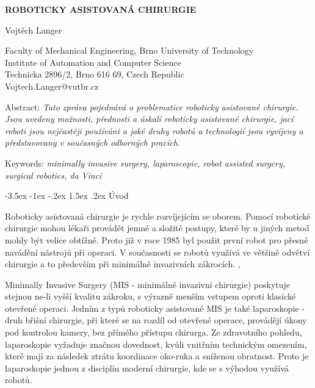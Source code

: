 \documentclass[10pt, a4paper]{article}
\makeatletter
\theoremstyle{definition}
\renewcommand\section{\@startsection {section}{1}{\z@}%
                                   {-3.5ex \@plus -1ex \@minus -.2ex}%
                                   {1.5ex \@plus.2ex}%
                                   {\large\bfseries}}
\makeatother
\begin{document}
\pagestyle{empty}

\begin{center}
{\bf \Large ROBOTICKY ASISTOVANÁ CHIRURGIE}
\end{center}

\smallskip
\begin{center}
{\large Vojtěch Langer}
\end{center}

\smallskip
\begin{center}
Faculty of Mechanical Engineering, Brno University of Technology\\
Institute of Automation and Computer Science\\
Technicka 2896/2, Brno 616 69, Czech Republic\\
Vojtech.Langer@vutbr.cz\\
\end{center}

\bigskip
\noindent Abstract:
\textit{Tato zpráva pojednává o problematice roboticky asistované chirurgie.
Jsou uvedeny možnosti, přednosti a úskalí roboticky asistované chirurgie,
jací roboti jsou nejčastěji používáni a jaké druhy robotů a technologií
jsou vyvíjeny a představovany v současných odborných pracích.}

\vspace*{10pt}
\noindent Keywords:
\textit{minimally invasive surgery,
laparoscopic, robot assisted surgery,
surgical robotics, da Vinci}
\bigskip

\section{Úvod}
\label{sec:uvod}

Roboticky asistovaná chirurgie je rychle rozvíjejícím se oborem.
Pomocí robotické chirurgie mohou lékaři provádět jemné a složité postupy,
které by u jiných metod mohly být velice obtížné.
Proto již v roce 1985 byl použit první robot pro přesné navádění nástrojů při operaci.
V současnosti se robotů využívá ve většině odvětví chirurgie a to především
při minimálně invazivních zákrocích. \cite{mis_thesis},\cite{mis_mou}

Minimally Invasive Surgery (MIS - minimálně invazivní chirurgie)
poskytuje stejnou ne-li vyšší kvalitu zákroku, s výrazně menším vstupem
oproti klasické otevřené operaci. Jedním z typů roboticky asistované MIS
je také laparoskopie - druh břišní chirurgie, při které se na rozdíl od otevřené operace,
provádějí úkony pod kontrolou kamery, bez přímého přístupu chirurga.
Ze zdravotního pohledu, laparoskopie vyžaduje značnou dovednost,
kvůli vnitřním technickým omezením, které mají za následek ztrátu
koordinace oko-ruka a sníženou obratnost. Proto je laparoskopie
jednou z disciplín moderní chirurgie, kde se s výhodou využívá robotů. \cite{minirobot}
\end{document}

